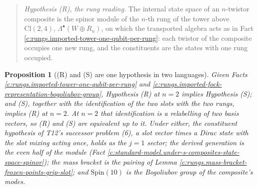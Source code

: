 \documentclass[11pt]{article}
\newtheorem{proposition}[theorem]{Proposition}
\theoremstyle{definition}
\theoremstyle{plain}
\providecommand{\Cl}{}\renewcommand{\Cl}{\mathrm{Cl}}
\begin{document}
\label{c:note.rungs.setting-exact-part-what-towers-spinor}
\begin{quote}
\emph{Hypothesis (R), the rung reading.} The internal state space of an $n$-twistor composite is the spinor module of the $n$-th rung of the tower above $\Cl(2,4)$, $\Lambda^{\bullet}(W \oplus R_{n})$, on which the transported algebra acts as in Fact \ref{c:rungs.imported-tower-one-qubit-per-rung}: each twistor of the composite occupies one new rung, and the constituents are the states with one rung occupied.
\end{quote}

\begin{proposition}[(R) and (S) are one hypothesis in two languages]\label{c:rungs.r-s-are-one-hypothesis-two}
Given Facts \ref{c:rungs.imported-tower-one-qubit-per-rung} and \ref{c:rungs.imported-fock-representation-bogoliubov-group}, Hypothesis (R) at $n = 2$ implies Hypothesis (S); and (S), together with the identification of the two slots with the two rungs, implies (R) at $n = 2$. At $n = 2$ that identification is a relabelling of two basis vectors, so (R) and (S) are equivalent up to it. Under either, the constituent hypothesis of T12's successor problem (6), a slot vector times a Dirac state with the slot mixing acting once, holds as the $j = 1$ sector; the derived generation is the even half of the module (Fact \ref{c:standard-model.under-s-composites-state-space-spinor}); the mass bracket is the pairing of Lemma \ref{c:rungs.mass-bracket-frozen-points-grip-slot}; and $\mathrm{Spin}(10)$ is the Bogoliubov group of the composite's modes.
\end{proposition}
\end{document}
